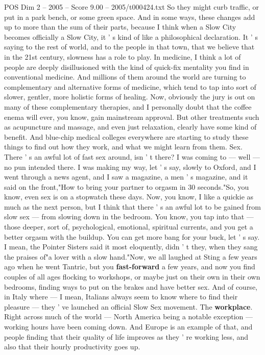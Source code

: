 \begin{textsample}{POS Dim 2 – 2005 – Score 9.00 – 2005/t000424.txt}
So they might curb traffic, or put in a park bench, or some green space.
And in some ways, these changes add up to more than the sum of their parts, because I think when a Slow City becomes officially a Slow City, it ' s kind of like a philosophical declaration.
It ' s saying to the rest of world, and to the people in that town, that we believe that in the 21st century, slowness has a role to play.
In medicine, I think a lot of people are deeply disillusioned with the kind of quick-fix mentality you find in conventional medicine.
And millions of them around the world are turning to complementary and alternative forms of medicine, which tend to tap into sort of slower, gentler, more holistic forms of healing.
Now, obviously the jury is out on many of these complementary therapies, and I personally doubt that the coffee enema will ever, you know, gain mainstream approval.
But other treatments such as acupuncture and massage, and even just relaxation, clearly have some kind of benefit.
And blue-chip medical colleges everywhere are starting to study these things to find out how they work, and what we might learn from them.
Sex.
There ' s an awful lot of fast sex around, isn ' t there?
I was coming to — well — no pun intended there.
I was making my way, let ' s say, slowly to Oxford, and I went through a news agent, and I saw a magazine, a men ' s magazine, and it said on the front,"How to bring your partner to orgasm in 30 seconds."So, you know, even sex is on a stopwatch these days.
Now, you know, I like a quickie as much as the next person, but I think that there ' s an awful lot to be gained from slow sex — from slowing down in the bedroom.
You know, you tap into that — those deeper, sort of, psychological, emotional, spiritual currents, and you get a better orgasm with the buildup.
You can get more bang for your buck, let ' s say.
I mean, the Pointer Sisters said it most eloquently, didn ' t they, when they sang the praises of"a lover with a slow hand."Now, we all laughed at Sting a few years ago when he went Tantric, but you \textbf{fast-forward} a few years, and now you find couples of all ages flocking to workshops, or maybe just on their own in their own bedrooms, finding ways to put on the brakes and have better sex.
And of course, in Italy where — I mean, Italians always seem to know where to find their pleasure — they ' ve launched an official Slow Sex movement.
The \textbf{workplace}.
Right across much of the world — North America being a notable exception — working hours have been coming down.
And Europe is an example of that, and people finding that their quality of life improves as they ' re working less, and also that their hourly productivity goes up.

\end{textsample}
